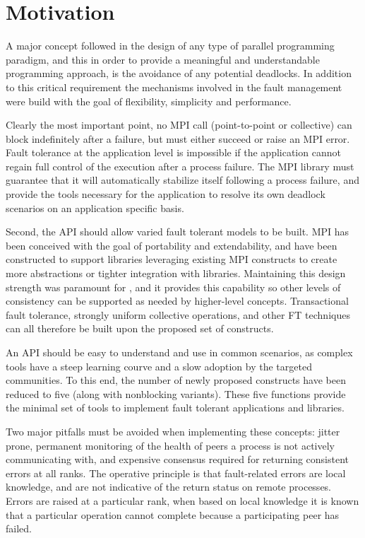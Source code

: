 \section{Motivation}
\label{sect:motivation}

A major concept followed in the design of any type of parallel programming paradigm, and
this in order to provide a meaningful and understandable programming approach,
is the avoidance of any potential deadlocks. In addition to this critical
requirement the mechanisms involved in the fault management were build with the
goal of flexibility, simplicity and performance.

Clearly the most important point, no MPI call (point-to-point or collective) can
block indefinitely after a failure, but must either succeed or raise an MPI
error. Fault tolerance at the application level is impossible if the application
cannot regain full control of the execution after a process failure. The MPI
library must guarantee that it will automatically stabilize itself following a
process failure, and provide the tools necessary for the application to resolve
its own deadlock scenarios on an application specific basis.

Second, the API should allow varied fault tolerant models to be built. MPI has
been conceived with the goal of portability and extendability, and have been
constructed to support libraries leveraging existing MPI constructs to create
more abstractions or tighter integration with libraries. Maintaining this design
strength was paramount for \ulfm, and it provides this capability so other
levels of consistency can be supported as needed by higher-level
concepts. Transactional fault tolerance, strongly uniform collective operations,
and other FT techniques can all therefore be built upon the proposed set of
constructs.

An API should be easy to understand and use in common scenarios, as complex
tools have a steep learning courve and a slow adoption by the targeted
communities. To this end, the number of newly proposed constructs have been
reduced to five (along with nonblocking variants). These five functions provide
the minimal set of tools to implement fault tolerant applications and libraries.

Two major pitfalls must be avoided when implementing these concepts: jitter
prone, permanent monitoring of the health of peers a process is not actively
communicating with, and expensive consensus required for returning consistent
errors at all ranks.  The operative principle is that fault-related errors are
local knowledge, and are not indicative of the return status on remote
processes. Errors are raised at a particular rank, when based on local knowledge
it is known that a particular operation cannot complete because a participating
peer has failed.

